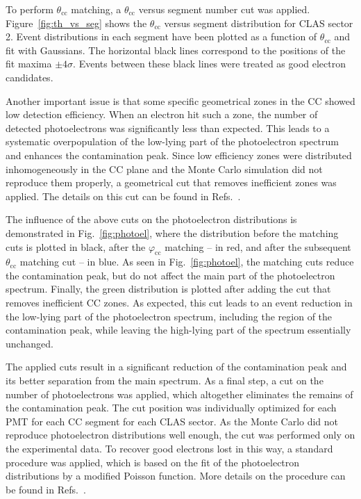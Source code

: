 \documentclass[prc,twocolumn,superscriptaddress,showpacs,amssymb,amsmath,amsfonts,aps,nofootinbib]{revtex4-1}
\begin{document}
To perform $\theta_{\text{cc}}$ matching, a $\theta_{\text{cc}}$ versus segment number cut was applied. Figure~\ref{fig:th_vs_seg} shows the $\theta_{\text{cc}}$ versus segment distribution for CLAS sector 2. Event distributions in each segment have been plotted as a function of $\theta_{\text{cc}}$ and fit with Gaussians. The horizontal black lines correspond to the positions of the fit maxima $\pm4\sigma$. Events between these black lines were treated as good electron candidates.




Another important issue is that some specific geometrical zones in the CC showed low detection efficiency. When an electron hit such a zone, the number of detected photoelectrons was significantly less than expected. This leads to a systematic overpopulation of the low-lying part of the photoelectron spectrum and enhances the contamination peak. Since low efficiency zones were distributed inhomogeneously in the CC plane and the Monte Carlo simulation did not reproduce them properly, a geometrical cut that removes inefficient zones was applied. The details on this cut can be found in Refs.\!~\cite{my_an_note:2020, my_thesis:2021,Fed_an_note:2017,Fed_paper_2018}.




The influence of the above cuts on the photoelectron distributions is demonstrated in Fig.\!~\ref{fig:photoel}, where the distribution before the matching cuts is plotted in black, after the $\varphi_{\text{cc}}$ matching -- in red, and after the subsequent $\theta_{\text{cc}}$ matching cut -- in blue. As seen in Fig.\!~\ref{fig:photoel}, the matching cuts reduce the contamination peak, but do not affect the main part of the photoelectron spectrum. Finally, the green distribution is plotted after adding the cut that removes inefficient CC zones. As expected, this cut leads to an event reduction in the low-lying part of the photoelectron spectrum, including the region of the contamination peak, while leaving the high-lying part of the spectrum essentially unchanged.


The applied cuts result in a significant reduction of the contamination peak and its better separation from the main spectrum. As a final step, a cut on the number of photoelectrons was applied, which altogether eliminates the remains of the contamination peak. The cut position was individually optimized for each PMT for each CC segment for each CLAS sector. As the Monte Carlo did not reproduce photoelectron distributions well enough, the cut was performed only on the experimental data. To recover good electrons lost in this way, a standard procedure was applied, which is based on the fit of the photoelectron distributions by a modified Poisson function. More details on the procedure can be found in Refs.\!~\cite{my_an_note:2020, my_thesis:2021,Fed_an_note:2017,Fed_paper_2018}.
\end{document}
